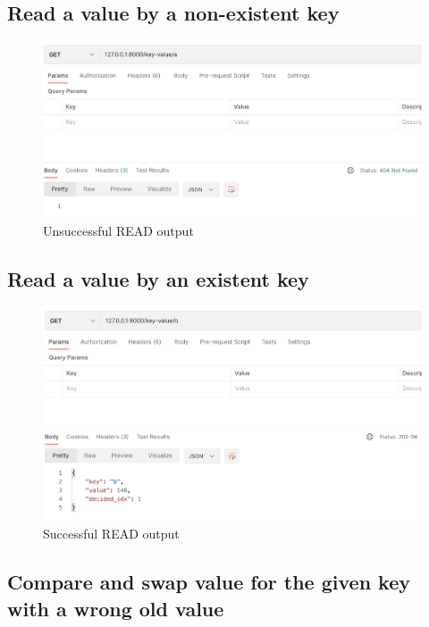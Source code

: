 \documentclass[a4paper, 11pt]{article}
\begin{document}
\subsection{Read a value by a non-existent key}

\begin{figure}[H]
\centering
\includegraphics[width=\textwidth,keepaspectratio]{get404.png}
\caption{Unsuccessful READ output}
\end{figure}

\subsection{Read a value by an existent key}

\begin{figure}[H]
\centering
\includegraphics[width=\textwidth,keepaspectratio]{get200.png}
\caption{Successful READ output}
\end{figure}

\subsection{Compare and swap value for the given key with a wrong old value}
\end{document}
